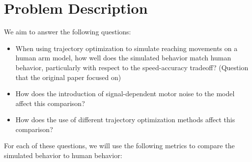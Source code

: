\documentclass[table,12pt]{article}
\begin{document}
\section{Problem Description}
We aim to answer the following questions: 
\begin{itemize}
    \item When using trajectory optimization to simulate reaching movements on a human arm model, how well does the simulated behavior match human behavior, particularly with respect to the speed-accuracy tradeoff? (Question that the original paper focused on)

    \item How does the introduction of signal-dependent motor noise to the model affect this comparison?

    \item How does the use of different trajectory optimization methods affect this comparison?
\end{itemize}
For each of these questions, we will use the following metrics to compare the simulated behavior to human behavior:
\end{document}
